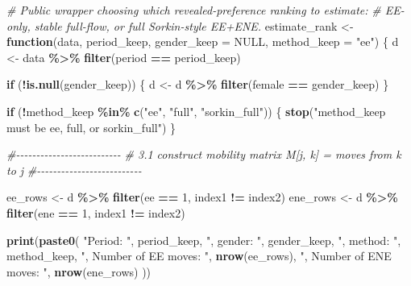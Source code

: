 \documentclass[
]{article}
\newenvironment{Shaded}{\begin{snugshade}}{\end{snugshade}}
\newcommand{\AttributeTok}[1]{\textcolor[rgb]{0.13,0.29,0.53}{#1}}
\newcommand{\CommentTok}[1]{\textcolor[rgb]{0.56,0.35,0.01}{\textit{#1}}}
\newcommand{\ConstantTok}[1]{\textcolor[rgb]{0.56,0.35,0.01}{#1}}
\newcommand{\ControlFlowTok}[1]{\textcolor[rgb]{0.13,0.29,0.53}{\textbf{#1}}}
\newcommand{\DecValTok}[1]{\textcolor[rgb]{0.00,0.00,0.81}{#1}}
\newcommand{\FunctionTok}[1]{\textcolor[rgb]{0.13,0.29,0.53}{\textbf{#1}}}
\newcommand{\NormalTok}[1]{#1}
\newcommand{\OtherTok}[1]{\textcolor[rgb]{0.56,0.35,0.01}{#1}}
\newcommand{\SpecialCharTok}[1]{\textcolor[rgb]{0.81,0.36,0.00}{\textbf{#1}}}
\newcommand{\StringTok}[1]{\textcolor[rgb]{0.31,0.60,0.02}{#1}}
\begin{document}
\begin{Shaded}
\begin{Highlighting}[]
\CommentTok{\# Public wrapper choosing which revealed{-}preference ranking to estimate:}
\CommentTok{\# EE{-}only, stable full{-}flow, or full Sorkin{-}style EE+ENE.}
\NormalTok{estimate\_rank }\OtherTok{\textless{}{-}} \ControlFlowTok{function}\NormalTok{(data, period\_keep, }\AttributeTok{gender\_keep =} \ConstantTok{NULL}\NormalTok{, }\AttributeTok{method\_keep =} \StringTok{"ee"}\NormalTok{) \{}
\NormalTok{    d }\OtherTok{\textless{}{-}}\NormalTok{ data }\SpecialCharTok{\%\textgreater{}\%}
        \FunctionTok{filter}\NormalTok{(period }\SpecialCharTok{==}\NormalTok{ period\_keep)}

    \ControlFlowTok{if}\NormalTok{ (}\SpecialCharTok{!}\FunctionTok{is.null}\NormalTok{(gender\_keep)) \{}
\NormalTok{        d }\OtherTok{\textless{}{-}}\NormalTok{ d }\SpecialCharTok{\%\textgreater{}\%} \FunctionTok{filter}\NormalTok{(female }\SpecialCharTok{==}\NormalTok{ gender\_keep)}
\NormalTok{    \}}

    \ControlFlowTok{if}\NormalTok{ (}\SpecialCharTok{!}\NormalTok{method\_keep }\SpecialCharTok{\%in\%} \FunctionTok{c}\NormalTok{(}\StringTok{"ee"}\NormalTok{, }\StringTok{"full"}\NormalTok{, }\StringTok{"sorkin\_full"}\NormalTok{)) \{}
        \FunctionTok{stop}\NormalTok{(}\StringTok{"method\_keep must be \textquotesingle{}ee\textquotesingle{}, \textquotesingle{}full\textquotesingle{}, or \textquotesingle{}sorkin\_full\textquotesingle{}"}\NormalTok{)}
\NormalTok{    \}}

    \CommentTok{\#{-}{-}{-}{-}{-}{-}{-}{-}{-}{-}{-}{-}{-}{-}{-}{-}{-}{-}{-}{-}{-}{-}{-}{-}{-}{-}}
    \CommentTok{\# 3.1 construct mobility matrix M[j, k] = moves from k to j}
    \CommentTok{\#{-}{-}{-}{-}{-}{-}{-}{-}{-}{-}{-}{-}{-}{-}{-}{-}{-}{-}{-}{-}{-}{-}{-}{-}{-}{-}}

\NormalTok{    ee\_rows }\OtherTok{\textless{}{-}}\NormalTok{ d }\SpecialCharTok{\%\textgreater{}\%} \FunctionTok{filter}\NormalTok{(ee }\SpecialCharTok{==} \DecValTok{1}\NormalTok{, index1 }\SpecialCharTok{!=}\NormalTok{ index2)}
\NormalTok{    ene\_rows }\OtherTok{\textless{}{-}}\NormalTok{ d }\SpecialCharTok{\%\textgreater{}\%} \FunctionTok{filter}\NormalTok{(ene }\SpecialCharTok{==} \DecValTok{1}\NormalTok{, index1 }\SpecialCharTok{!=}\NormalTok{ index2)}

    \FunctionTok{print}\NormalTok{(}\FunctionTok{paste0}\NormalTok{(}
        \StringTok{"Period: "}\NormalTok{, period\_keep,}
        \StringTok{", gender: "}\NormalTok{, gender\_keep,}
        \StringTok{", method: "}\NormalTok{, method\_keep,}
        \StringTok{", Number of EE moves: "}\NormalTok{, }\FunctionTok{nrow}\NormalTok{(ee\_rows),}
        \StringTok{", Number of ENE moves: "}\NormalTok{, }\FunctionTok{nrow}\NormalTok{(ene\_rows)}
\NormalTok{    ))}


\end{Highlighting}
\end{Shaded}
\end{document}
